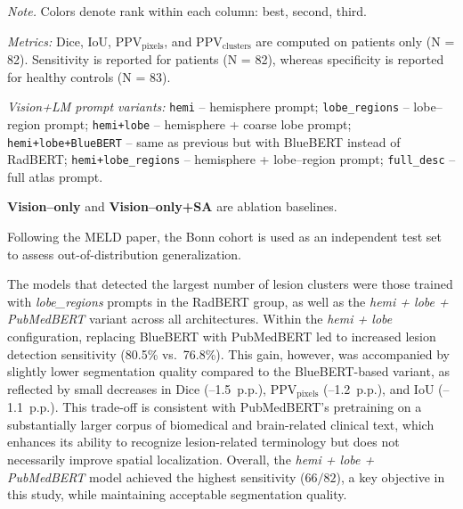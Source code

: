 \documentclass[FCD_GNN.tex]{subfiles}
\begin{document}
\begin{table}[H]
\begin{threeparttable}
    \begin{tablenotes}[flushleft]
    \footnotesize
    \item \textit{Note.} Colors denote rank within each column:
    \colorbox{green!15}{best}, \colorbox{cyan!15}{second}, \colorbox{orange!15}{third}.
    \item \textit{Metrics: } Dice, IoU, PPV$_{\text{pixels}}$, and PPV$_{\text{clusters}}$ are computed on patients only (N = 82). 
    Sensitivity is reported for patients (N = 82), whereas specificity is reported for healthy controls (N = 83).
    \item \textit{Vision+LM prompt variants:}
    \texttt{hemi} -- hemisphere prompt;
    \texttt{lobe\_regions} -- lobe--region prompt;
    \texttt{hemi+lobe} -- hemisphere + coarse lobe prompt;
    \texttt{hemi+lobe+BlueBERT} -- same as previous but with BlueBERT instead of RadBERT; 
    \texttt{hemi+lobe\_regions} -- hemisphere + lobe--region prompt;
    \texttt{full\_desc} -- full atlas prompt.
    \item \textbf{Vision--only} and \textbf{Vision--only+SA} are ablation baselines.
    \end{tablenotes}
    \end{threeparttable}
    
\end{table}
Following the MELD paper, the Bonn cohort is used as an independent test set to assess out-of-distribution generalization.

The models that detected the largest number of lesion clusters were those trained with
\textit{lobe\_regions} prompts in the RadBERT group, as well as the
\textit{hemi + lobe + PubMedBERT} variant across all architectures.
Within the \textit{hemi + lobe} configuration, replacing BlueBERT with PubMedBERT led
to increased lesion detection sensitivity (80.5\% vs.\ 76.8\%).
This gain, however, was accompanied by slightly lower segmentation quality compared to
the BlueBERT-based variant, as reflected by small decreases in Dice (–1.5~p.p.),
PPV$_{\text{pixels}}$ (–1.2~p.p.), and IoU (–1.1~p.p.).
This trade-off is consistent with PubMedBERT’s pretraining on a substantially larger
corpus of biomedical and brain-related clinical text, which enhances its ability to
recognize lesion-related terminology but does not necessarily improve spatial localization.
Overall, the \textit{hemi + lobe + PubMedBERT} model achieved the highest sensitivity
($66/82$), a key objective in this study, while maintaining acceptable segmentation quality.
\end{document}
